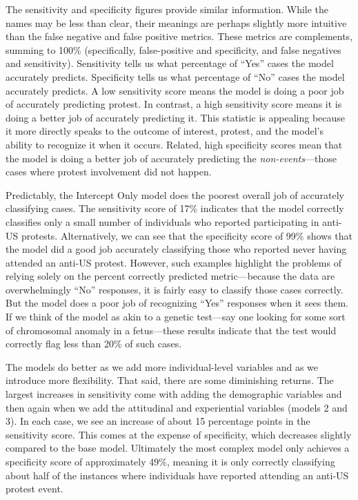 			The sensitivity and specificity figures provide similar information. While the names may be less than clear, their meanings are perhaps slightly more intuitive than the false negative and false positive metrics. These metrics are complements, summing to 100\% (specifically, false-positive and specificity, and false negatives and sensitivity). Sensitivity tells us what percentage of ``Yes'' cases the model accurately predicts. Specificity tells us what percentage of ``No'' cases the model accurately predicts. A low sensitivity score means the model is doing a poor job of accurately predicting protest.
			In contrast, a high sensitivity score means it is doing a better job of accurately predicting it. This statistic is appealing because it more directly speaks to the outcome of interest, protest, and the model's ability to recognize it when it occurs. Related, high specificity scores mean that the model is doing a better job of accurately predicting the \emph{non-events}---those cases where protest involvement did not happen. 
			
			Predictably, the Intercept Only model does the poorest overall job of accurately classifying cases. The sensitivity score of 17\% indicates that the model correctly classifies only a small number of individuals who reported participating in anti-US protests. Alternatively, we can see that the specificity score of 99\% shows that the model did a good job accurately classifying those who reported never having attended an anti-US protest. However, such examples highlight the problems of relying solely on the percent correctly predicted metric---because the data are overwhelmingly ``No'' responses, it is fairly easy to classify those cases correctly. But the model does a poor job of recognizing ``Yes'' responses when it sees them. If we think of the model as akin to a genetic test---say one looking for some sort of chromosomal anomaly in a fetus---these results indicate that the test would correctly flag less than 20\% of such cases.
			
			The models do better as we add more individual-level variables and as we introduce more flexibility. That said, there are some diminishing returns. The largest increases in sensitivity come with adding the demographic variables and then again when we add the attitudinal and experiential variables (models 2 and 3). In each case, we see an increase of about 15 percentage points in the sensitivity score. This comes at the expense of specificity, which decreases slightly compared to the base model. Ultimately the most complex model only achieves a specificity score of approximately 49\%, meaning it is only correctly classifying about half of the instances where individuals have reported attending an anti-US protest event.
			

